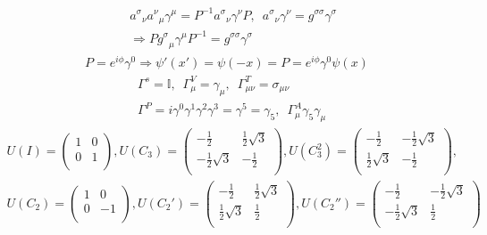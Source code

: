 \documentclass[floatfix,nofootinbib,superscriptaddress,fleqn]{revtex4}
\begin{document}
\begin{align*}
  &{a^\sigma}_\nu {a^\nu}_\mu\gamma^\mu=P^{-1}{a^\sigma}_\nu\gamma^\nu P,\,\,\,
  {a^\sigma}_\nu\gamma^\nu=g^{\sigma\sigma}\gamma^{\sigma}  \\\
  &\Longrightarrow P{g^\sigma}_\mu\gamma^\mu P^{-1}=g^{\sigma\sigma}\gamma^{\sigma} 
\end{align*}
\begin{align*}
  P=e^{i\phi}\gamma^0\Longrightarrow \psi'(x')=\psi(-x)=P=e^{i\phi}\gamma^0\psi(x)
\end{align*}
\begin{align*}
  &\Gamma^s=\mathbb{I},\,\,\,\Gamma^V_\mu=\gamma_\mu,\,\,\,\Gamma^T_{\mu\nu}=\sigma_{\mu\nu} \\
  &\Gamma^P=i\gamma^0\gamma^1\gamma^2\gamma^3=\gamma^5=\gamma_5,\,\,\,\Gamma^A_\mu\gamma_5\gamma_\mu
\end{align*}
\begin{align*}
  U(I) = \begin{pmatrix}
    1&0\\
    0&1\\
  \end{pmatrix},
  U(C_3)= \begin{pmatrix}
    -\frac12&\frac12\sqrt{3}  \\
    -\frac12\sqrt{3}&-\frac12  \\
  \end{pmatrix}  ,
  U(C_3^2)= \begin{pmatrix}
    -\frac12&-\frac12\sqrt{3}  \\
    \frac12\sqrt{3}&-\frac12  \\
  \end{pmatrix} ,\\
  U(C_2)= \begin{pmatrix}
    1&0  \\
    0&-1  \\
  \end{pmatrix},
  U(C_2')= \begin{pmatrix}
    -\frac12&\frac12\sqrt{3}  \\
    \frac12\sqrt{3}&\frac12  \\
  \end{pmatrix},
  U(C_2'')= \begin{pmatrix}
    -\frac12&-\frac12\sqrt{3}  \\
    -\frac12\sqrt{3}&\frac12  \\
  \end{pmatrix}
\end{align*}
\end{document}
